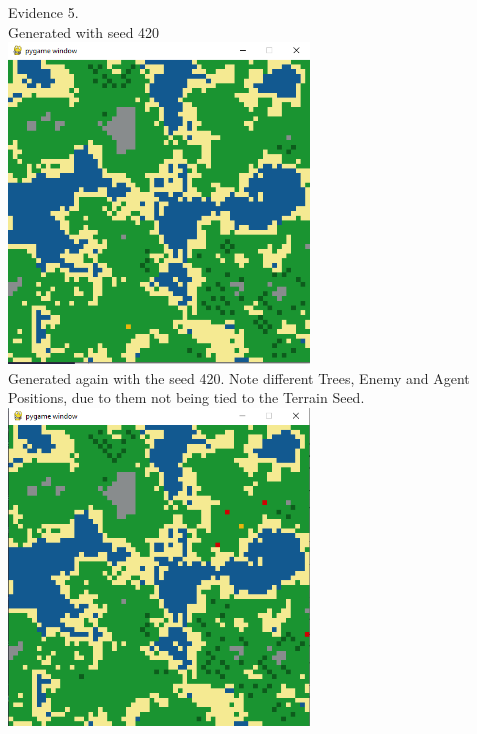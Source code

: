 \begin{center}
    {\large Evidence 5.\rn } \\ 
    \vspace{0.3cm}
    Generated with seed 420 \\
    \includegraphics[width=8cm]{Images/Testing/T5.9.1.PNG} \\
    Generated again with the seed 420. Note different Trees, Enemy and Agent Positions, due to them not being
    tied to the Terrain Seed. \\
    \includegraphics[width=8cm]{Images/Testing/T5.9.2.PNG} \\
    \vspace{1cm}
    
\end{center}